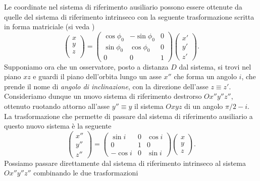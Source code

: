 {Le coordinate nel sistema di riferimento ausiliario possono essere ottenute da
quelle del sistema di riferimento intrinseco con la seguente trasformazione
scritta in forma matriciale (si veda \textcite{goldstein:meccanica})
\begin{equation}
  \begin{pmatrix}
    x \\
    y \\
    z \\
  \end{pmatrix} =
  \begin{pmatrix}
    \cos\phi_0 & -\sin\phi_0 & 0 \\
    \sin\phi_0 & \cos\phi_0  & 0 \\
    0          & 0           & 1
  \end{pmatrix}
  \begin{pmatrix}
    x' \\
    y' \\
    z'
  \end{pmatrix}.
\end{equation}
Supponiamo ora che un osservatore, posto a distanza $D$ dal sistema, si trovi
nel piano $xz$ e guardi il piano dell'orbita lungo un asse $x''$ che forma un
angolo $i$, che prende il nome di \emph{angolo di inclinazione}, con la
direzione dell'asse $z\equiv z'$. Consideriamo dunque un nuovo sistema di
riferimento destrorso $Ox''y''z''$, ottenuto ruotando attorno all'asse
$y''\equiv y$ il sistema $Oxyz$ di un angolo $\pi/2 - i$. La trasformazione che
permette di passare dal sistema di riferimento ausiliario a questo nuovo sistema
è la seguente
\begin{equation}
  \begin{pmatrix}
    x'' \\
    y'' \\
    z''
  \end{pmatrix} =
  \begin{pmatrix}
    \sin i  & 0 & \cos i \\
    0       & 1 & 0      \\
    -\cos i & 0 & \sin i
  \end{pmatrix}
  \begin{pmatrix}
    x \\
    y \\
    z
  \end{pmatrix}.
\end{equation}
Possiamo passare direttamente dal sistema di riferimento intrinseco al sistema
$Ox''y''z''$ combinando le due trasformazioni
}
